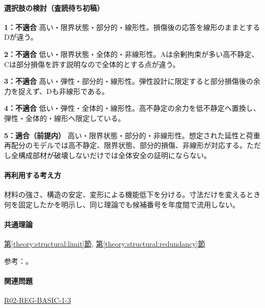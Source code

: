 \paragraph{選択肢の検討（査読待ち初稿）}\mbox{}\par

\noindent\textbf{1：不適合} 高い・限界状態・部分的・線形性。損傷後の応答を線形のままとするDが違う。\par

\noindent\textbf{2：不適合} 低い・限界状態・全体的・非線形性。Aは余剰拘束が多い高不静定、Cは部分損傷を許す説明なので全体的とする点が違う。\par

\noindent\textbf{3：不適合} 高い・弾性・部分的・線形性。弾性設計に限定すると部分損傷後の余力を捉えず、Dも非線形である。\par

\noindent\textbf{4：不適合} 低い・弾性・全体的・線形性。高不静定の余力を低不静定へ置換し、弾性・全体的・線形へ限定している。\par

\noindent\textbf{5：適合（前提内）} 高い・限界状態・部分的・非線形性。想定された延性と荷重再配分のモデルでは高不静定、限界状態、部分的損傷、非線形が対応する。ただし全構成部材が破壊しないだけでは全体安全の証明にならない。\par

\paragraph{再利用する考え方} 材料の強さ、構造の安定、変形による機能低下を分ける。寸法だけを変えるとき何を固定したかを明示し、同じ理論でも候補番号を年度間で流用しない。

\paragraph{共通理論} \hyperref[theory:structural:limit]{第\ref*{theory:structural:limit}節}, \hyperref[theory:structural:redundancy]{第\ref*{theory:structural:redundancy}節}

\par 参考：\cite{struct_mit_beam,struct_mit_buckling,struct_mlit_limit}。

\paragraph{関連問題} \hyperref[q:r02-reg-basic-1-3]{R02-REG-BASIC-1-3}

